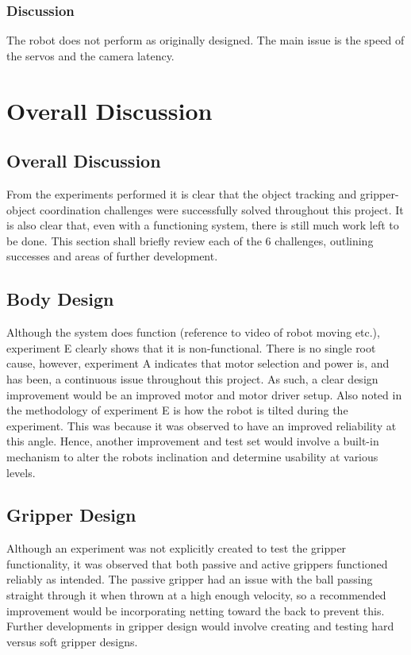 \documentclass[conference]{IEEEtran}
\begin{document}
\subsubsection{Discussion}
The robot does not perform as originally designed. The main issue is the speed of the servos and the camera latency.


\section{Overall Discussion}\label{overall}
\subsection{Overall Discussion}
From the experiments performed it is clear that the object tracking and gripper-object coordination challenges were successfully solved throughout this project. It is also clear that, even with a functioning system, there is still much work left to be done. This section shall briefly review each of the 6 challenges, outlining successes and areas of further development.

\subsection{Body Design}
Although the system does function (reference to video of robot moving etc.), experiment E clearly shows that it is non-functional. There is no single root cause, however, experiment A indicates that motor selection and power is, and has been, a continuous issue throughout this project. As such, a clear design improvement would be an improved motor and motor driver setup.
Also noted in the methodology of experiment E is how the robot is tilted during the experiment. This was because it was observed to have an improved reliability at this angle. Hence, another improvement and test set would involve a built-in mechanism to alter the robots inclination and determine usability at various levels.

\subsection{Gripper Design}
Although an experiment was not explicitly created to test the gripper functionality, it was observed that both passive and active grippers functioned reliably as intended. The passive gripper had an issue with the ball passing straight through it when thrown at a high enough velocity, so a recommended improvement would be incorporating netting toward the back to prevent this.
Further developments in gripper design would involve creating and testing hard versus soft gripper designs.
\end{document}
